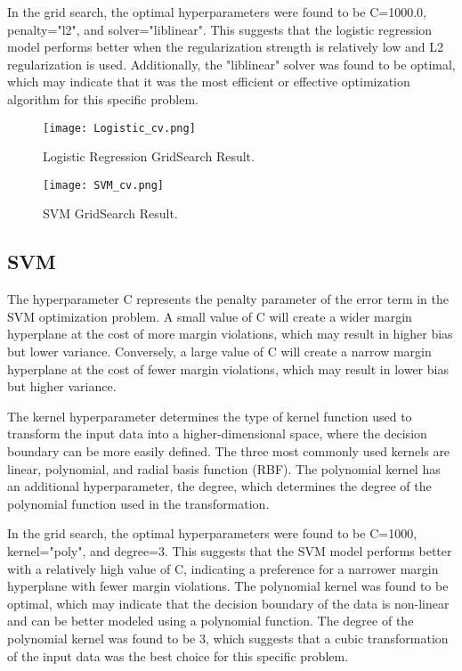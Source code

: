 \documentclass{article}
\begin{document}
In the grid search, the optimal hyperparameters were found to be C=1000.0, penalty="l2", and solver="liblinear". This suggests that the logistic regression model performs better when the regularization strength is relatively low and L2 regularization is used. Additionally, the "liblinear" solver was found to be optimal, which may indicate that it was the most efficient or effective optimization algorithm for this specific problem.

\begin{figure}[h]
  \centering
  \texttt{[image: Logistic\_cv.png]}
  \caption{Logistic Regression GridSearch Result.}
\end{figure}

\begin{figure}[h]
  \centering
  \texttt{[image: SVM\_cv.png]}
  \caption{SVM GridSearch Result.}
\end{figure}

\subsection{SVM}

The hyperparameter C represents the penalty parameter of the error term in the SVM optimization problem. A small value of C will create a wider margin hyperplane at the cost of more margin violations, which may result in higher bias but lower variance. Conversely, a large value of C will create a narrow margin hyperplane at the cost of fewer margin violations, which may result in lower bias but higher variance.

The kernel hyperparameter determines the type of kernel function used to transform the input data into a higher-dimensional space, where the decision boundary can be more easily defined. The three most commonly used kernels are linear, polynomial, and radial basis function (RBF). The polynomial kernel has an additional hyperparameter, the degree, which determines the degree of the polynomial function used in the transformation.

In the grid search, the optimal hyperparameters were found to be C=1000, kernel="poly", and degree=3. This suggests that the SVM model performs better with a relatively high value of C, indicating a preference for a narrower margin hyperplane with fewer margin violations. The polynomial kernel was found to be optimal, which may indicate that the decision boundary of the data is non-linear and can be better modeled using a polynomial function. The degree of the polynomial kernel was found to be 3, which suggests that a cubic transformation of the input data was the best choice for this specific problem.
\end{document}
